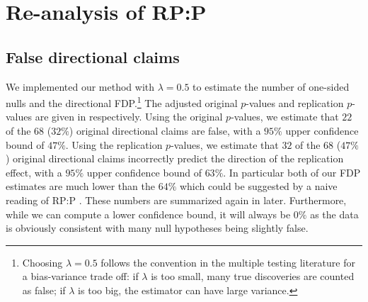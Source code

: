 \documentclass[aoas, preprint]{imsart}
\theoremstyle{definition}
\theoremstyle{custom}
\begin{document}
\section{Re-analysis of RP:P}
\label{sec:analysis}

\subsection{False directional claims}

  We implemented our method with $\lambda = 0.5$ to estimate the number of one-sided nulls and the directional FDP.\footnote{Choosing $\lambda = 0.5$ follows the convention in the multiple testing literature for a bias-variance trade off: if $\lambda$ is too small, many true discoveries are counted as false; if $\lambda$ is too big, the estimator can have large variance.} The adjusted original $p$-values and replication $p$-values are given in  respectively. Using the original $p$-values, we estimate that $22$ of the $68$ ($32\%$) original directional claims are false, with a $95\%$ upper confidence bound of $47\%$. Using the replication $p$-values, we estimate that $32$ of the $68$ ($47\%$) original directional claims incorrectly predict the direction of the replication effect, with a $95\%$ upper confidence bound of $63\%$. In particular both of our FDP estimates are much lower than the $64\%$ which could be suggested by a naive reading of RP:P \citep[e.g.][]{Baker:2015kd}. These numbers are summarized again in  later. Furthermore, while we can compute a lower confidence bound, it will always be $0\%$ as the data is obviously consistent with many null hypotheses being slightly false.
\end{document}
